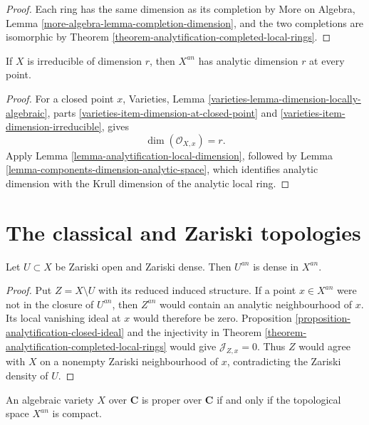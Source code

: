 \begin{proof}
Each ring has the same dimension as its completion by More on Algebra, Lemma
\ref{more-algebra-lemma-completion-dimension}, and the two completions are
isomorphic by Theorem \ref{theorem-analytification-completed-local-rings}.
\end{proof}

\begin{lemma}
\label{lemma-analytification-dimension}
If $X$ is irreducible of dimension $r$, then $X^{an}$ has analytic dimension
$r$ at every point.
\end{lemma}

\begin{proof}
For a closed point $x$, Varieties, Lemma
\ref{varieties-lemma-dimension-locally-algebraic}, parts
\ref{varieties-item-dimension-at-closed-point} and
\ref{varieties-item-dimension-irreducible}, gives
$$
\dim(\mathcal O_{X,x})=r.
$$
Apply
Lemma \ref{lemma-analytification-local-dimension}, followed by
Lemma \ref{lemma-components-dimension-analytic-space}, which identifies
analytic dimension with the Krull dimension of the analytic local ring.
\end{proof}

\section{The classical and Zariski topologies}
\label{section-classical-zariski-topologies}

\begin{lemma}
\label{lemma-zariski-dense-open-analytically-dense}
Let $U \subset X$ be Zariski open and Zariski dense. Then $U^{an}$ is dense
in $X^{an}$.
\end{lemma}

\begin{proof}
Put $Z=X\setminus U$ with its reduced induced structure. If a point
$x \in X^{an}$ were not in the closure of $U^{an}$, then $Z^{an}$ would
contain an analytic neighbourhood of $x$. Its local vanishing ideal at $x$
would therefore be zero. Proposition
\ref{proposition-analytification-closed-ideal} and the injectivity in
Theorem \ref{theorem-analytification-completed-local-rings} would give
$\mathcal J_{Z,x}=0$. Thus $Z$ would agree with $X$ on a nonempty Zariski
neighbourhood of $x$, contradicting the Zariski density of $U$.
\end{proof}

\begin{proposition}
\label{proposition-proper-if-and-only-if-compact-analytification}
An algebraic variety $X$ over $\mathbf C$ is proper over $\mathbf C$ if and
only if the topological space $X^{an}$ is compact.
\end{proposition}

